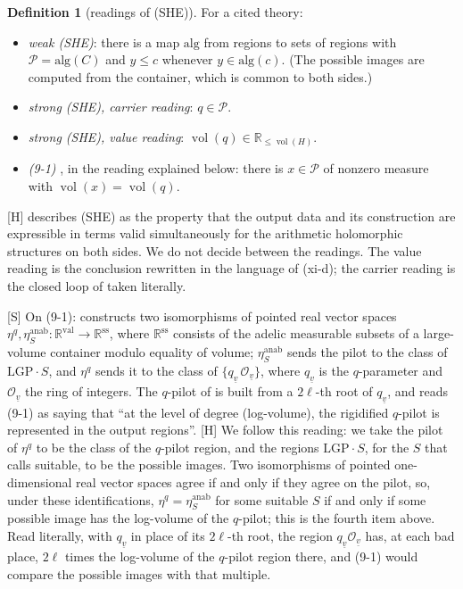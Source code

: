\documentclass[11pt]{article}
\theoremstyle{plain}
\theoremstyle{definition}
\newtheorem{definition}[theorem]{Definition}
\theoremstyle{remark}
\newcommand{\Smark}{\textup{[S]}}
\newcommand{\Hmark}{\textup{[H]}}
\newcommand{\vol}{\operatorname{vol}}
\newcommand{\Poss}{\mathcal P}
\begin{document}
\begin{definition}[readings of (SHE)]\label{d:she}
For a cited theory:
\begin{itemize}[leftmargin=2em]
\item \emph{weak (SHE)}: there is a map $\mathrm{alg}$ from regions to sets of regions
  with $\Poss=\mathrm{alg}(C)$ and $y\le c$ whenever $y\in\mathrm{alg}(c)$. (The possible
  images are computed from the container, which is common to both sides.)
\item \emph{strong (SHE), carrier reading}: $q\in\Poss$.
\item \emph{strong (SHE), value reading}: $\vol(q)\in\mathbb R_{\le\vol(H)}$.
\item \emph{(9-1)} \cite[\S\S9.2--9.3]{LANA}, in the reading explained below: there is
  $x\in\Poss$ of nonzero measure with $\vol(x)=\vol(q)$.
\end{itemize}
\end{definition}

\Hmark{} \cite[Rem.~3.11.1(iii)]{IUT3} describes (SHE) as the property that the output
data and its construction are expressible in terms valid simultaneously for the
arithmetic holomorphic structures on both sides. We do not decide between the readings.
The value reading is the conclusion rewritten in the language of (xi-d); the carrier
reading is the closed loop of \cite[Rem.~3.9.5(viii)(ix)]{IUT3} taken literally.

\Smark{} On (9-1): \cite[\S9.2]{LANA} constructs two isomorphisms of pointed real vector
spaces $\eta^q,\eta^{\mathrm{anab}}_S:\mathbb R^{\mathrm{val}}\to\mathbb R^{\mathrm{ss}}$,
where $\mathbb R^{\mathrm{ss}}$ consists of the adelic measurable subsets of a large-volume
container modulo equality of volume; $\eta^{\mathrm{anab}}_S$ sends the pilot to the class
of $\mathrm{LGP}\cdot S$, and $\eta^q$ sends it to the class of
$\{q_{\underline v}\,\mathcal O_{\underline v}\}$, where $q_{\underline v}$ is the
$q$-parameter and $\mathcal O_{\underline v}$ the ring of integers. The $q$-pilot of
\cite[\S4.2(c)]{LANA} is built from a $2\ell$-th root of $q_{\underline v}$, and
\cite[\S9.3]{LANA} reads (9-1) as saying that ``at the level of degree (log-volume), the
rigidified $q$-pilot is represented in the output regions''. \Hmark{} We follow this
reading: we take the pilot of $\eta^q$ to be the class of the $q$-pilot region, and the
regions $\mathrm{LGP}\cdot S$, for the $S$ that \cite[\S9.2]{LANA} calls suitable, to be the
possible images. Two isomorphisms of pointed one-dimensional real vector spaces agree if
and only if they agree on the pilot, so, under these identifications,
$\eta^q=\eta^{\mathrm{anab}}_S$ for some suitable $S$ if and only if some possible image
has the log-volume of the $q$-pilot; this is the fourth item above. Read literally, with
$q_{\underline v}$ in place of its $2\ell$-th root, the region
$q_{\underline v}\mathcal O_{\underline v}$ has, at each bad place, $2\ell$ times the
log-volume of the $q$-pilot region there, and (9-1) would compare the possible images with
that multiple.
\end{document}
